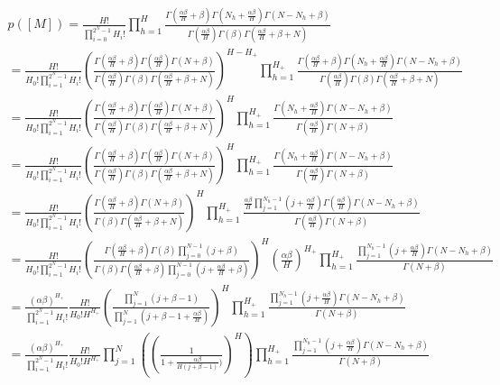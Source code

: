 ﻿\documentclass{jsarticle}
\begin{document}
\begin{equation}
\begin{split}
p([M]) = \frac{H!}{\prod_{i=0}^{2^N - 1}H_i!} \prod_{h=1}^H \frac{\Gamma(\frac{\alpha\beta}{H} + \beta)\Gamma(N_h + \frac{\alpha\beta}{H})\Gamma(N - N_h + \beta)}{\Gamma(\frac{\alpha\beta}{H})\Gamma(\beta)\Gamma(\frac{\alpha\beta}{H} + \beta + N)}\\
= \frac{H!}{H_0! \prod_{i=1}^{2^N - 1}H_i!} (\frac{\Gamma(\frac{\alpha\beta}{H} + \beta)\Gamma(\frac{\alpha\beta}{H})\Gamma(N + \beta)}{\Gamma(\frac{\alpha\beta}{H})\Gamma(\beta)\Gamma(\frac{\alpha\beta}{H} + \beta + N)})^{H - H_+} \prod_{h=1}^{H_+} \frac{\Gamma(\frac{\alpha\beta}{H} + \beta)\Gamma(N_h + \frac{\alpha\beta}{H})\Gamma(N - N_h + \beta)}{\Gamma(\frac{\alpha\beta}{H})\Gamma(\beta)\Gamma(\frac{\alpha\beta}{H} + \beta + N)}\\
= \frac{H!}{H_0! \prod_{i=1}^{2^N - 1}H_i!} (\frac{\Gamma(\frac{\alpha\beta}{H} + \beta)\Gamma(\frac{\alpha\beta}{H})\Gamma(N + \beta)}{\Gamma(\frac{\alpha\beta}{H})\Gamma(\beta)\Gamma(\frac{\alpha\beta}{H} + \beta + N)})^{H} \prod_{h=1}^{H_+} \frac{\Gamma(N_h + \frac{\alpha\beta}{H})\Gamma(N - N_h + \beta)}{\Gamma(\frac{\alpha\beta}{H}) \Gamma(N + \beta) }\\
= \frac{H!}{H_0! \prod_{i=1}^{2^N - 1}H_i!} (\frac{\Gamma(\frac{\alpha\beta}{H} + \beta)\Gamma(\frac{\alpha\beta}{H})\Gamma(N + \beta)}{\Gamma(\frac{\alpha\beta}{H})\Gamma(\beta)\Gamma(\frac{\alpha\beta}{H} + \beta + N)})^{H} \prod_{h=1}^{H_+} \frac{\Gamma(N_h + \frac{\alpha\beta}{H})\Gamma(N - N_h + \beta)}{\Gamma(\frac{\alpha\beta}{H}) \Gamma(N + \beta) }\\
= \frac{H!}{H_0! \prod_{i=1}^{2^N - 1}H_i!} (\frac{\Gamma(\frac{\alpha\beta}{H} + \beta)\Gamma(N + \beta)}{\Gamma(\beta)\Gamma(\frac{\alpha\beta}{H} + \beta + N)})^{H}  \prod_{h=1}^{H_+} \frac{\frac{\alpha\beta}{H}\prod_{j = 1}^{N_h - 1}(j + \frac{\alpha\beta}{H})\Gamma(\frac{\alpha\beta}{H})\Gamma(N - N_h + \beta)}{\Gamma(\frac{\alpha\beta}{H}) \Gamma(N + \beta) }\\
= \frac{H!}{H_0! \prod_{i=1}^{2^N - 1}H_i!} (\frac{\Gamma(\frac{\alpha\beta}{H} + \beta)\Gamma(\beta) \prod_{j = 0}^{N - 1}(j + \beta)}{\Gamma(\beta)\Gamma(\frac{\alpha\beta}{H} + \beta)\prod_{j = 0}^{N - 1} (j + \frac{\alpha\beta}{H} + \beta) })^{H}  (\frac{\alpha\beta}{H})^{H_+} \prod_{h=1}^{H_+}  \frac{\prod_{j = 1}^{N_h - 1}(j + \frac{\alpha\beta}{H})\Gamma(N - N_h + \beta)}{\Gamma(N + \beta) }\\
= \frac{(\alpha\beta)^{H_+}}{\prod_{i=1}^{2^N - 1}H_i!} \frac{H!}{H_0! H^{H_+}} (\frac{\prod_{j = 1}^{N}(j + \beta - 1)}{\prod_{j = 1}^{N} (j + \beta - 1 + \frac{\alpha\beta}{H}) })^{H}  \prod_{h=1}^{H_+}  \frac{\prod_{j = 1}^{N_h - 1}(j + \frac{\alpha\beta}{H})\Gamma(N - N_h + \beta)}{\Gamma(N + \beta) }\\
= \frac{(\alpha\beta)^{H_+}}{\prod_{i=1}^{2^N - 1}H_i!} \frac{H!}{H_0! H^{H_+}} \prod_{j = 1}^{N} ((\frac{1}{1 + \frac{\alpha\beta}{H(j + \beta - 1)}) })^{H})  \prod_{h=1}^{H_+}  \frac{\prod_{j = 1}^{N_h - 1}(j + \frac{\alpha\beta}{H})\Gamma(N - N_h + \beta)}{\Gamma(N + \beta) }\\
\end{split}
\end{equation}
\end{document}

